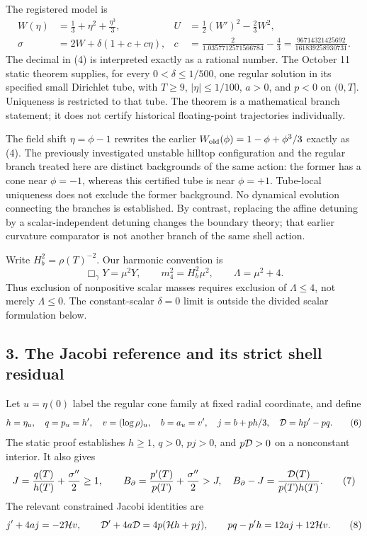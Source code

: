 \documentclass[
  11pt,
]{article}
\begin{document}
The registered model is \[
 \begin{aligned}
 W(\eta)&=\frac13+\eta^2+\frac{\eta^3}{3},&
 U&=\frac12(W')^2-\frac23W^2,\\
 \sigma&=2W+\delta(1+c+c\eta),&
 c&=\frac{2}{1.0357712571566784}-\frac43
   =\frac{96714321425692}{161839258930731}.
 \end{aligned}                                                   \tag{4}
\] The decimal in (4) is interpreted exactly as a rational number. The
October 11 static theorem supplies, for every \(0<\delta\le1/500\), one
regular solution in its specified small Dirichlet tube, with \(T\ge9\),
\(|\eta|\le1/100\), \(a>0\), and \(p<0\) on \((0,T]\). Uniqueness is
restricted to that tube. The theorem is a mathematical branch statement;
it does not certify historical floating-point trajectories individually.

The field shift \(\eta=\phi-1\) rewrites the earlier
\(W_{\rm old}(\phi)=1-\phi+\phi^3/3\) exactly as (4). The previously
investigated unstable hilltop configuration and the regular branch
treated here are distinct backgrounds of the same action: the former has
a cone near \(\phi=-1\), whereas this certified tube is near
\(\phi=+1\). Tube-local uniqueness does not exclude the former
background. No dynamical evolution connecting the branches is
established. By contrast, replacing the affine detuning by a
scalar-independent detuning changes the boundary theory; that earlier
curvature comparator is not another branch of the same shell action.

Write \(H_b^2=\rho(T)^{-2}\). Our harmonic convention is \[
 \Box_\gamma Y=\mu^2Y,\qquad m_4^2=H_b^2\mu^2,\qquad
 \Lambda=\mu^2+4.                                      \tag{5}
\] Thus exclusion of nonpositive scalar masses requires exclusion of
\(\Lambda\le4\), not merely \(\Lambda\le0\). The constant-scalar
\(\delta=0\) limit is outside the divided scalar formulation below.

\subsection{3. The Jacobi reference and its strict shell
residual}\label{the-jacobi-reference-and-its-strict-shell-residual}

Let \(u=\eta(0)\) label the regular cone family at fixed radial
coordinate, and define \[
 h=\eta_u,\quad q=p_u=h',\quad
 v=(\log\rho)_u,\quad b=a_u=v',\quad
 j=b+ph/3,\quad {\cal D}=hp'-pq.
 \tag{6}
\] The static proof establishes \(h\ge1\), \(q>0\), \(pj>0\), and
\(p{\cal D}>0\) on a nonconstant interior. It also gives \[
 J=\frac{q(T)}{h(T)}+\frac{\sigma''}{2}\ge1,\qquad
 B_\partial=\frac{p'(T)}{p(T)}+\frac{\sigma''}{2}>J,
 \quad B_\partial-J=\frac{{\cal D}(T)}{p(T)h(T)}.
 \tag{7}
\] The relevant constrained Jacobi identities are \[
 j'+4aj=-2{\cal H}v,\qquad
 {\cal D}'+4a{\cal D}=4p({\cal H}h+pj),\qquad
 pq-p'h=12aj+12{\cal H}v.
 \tag{8}
\]
\end{document}
